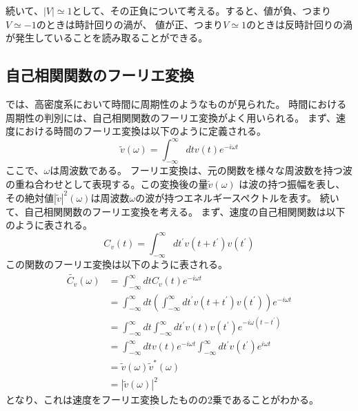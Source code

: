 \documentclass[/Users/ikedahajime/GitHub/reserch/master_report/thesis]{subfiles}
\begin{document}
続いて、$|V|\simeq 1$として、その正負について考える。すると、値が負、つまり$V\simeq -1$のときは時計回りの渦が、
値が正、つまり$V\simeq 1$のときは反時計回りの渦が発生していることを読み取ることができる。

\subsection{自己相関関数のフーリエ変換}
では、高密度系において時間に周期性のようなものが見られた。
時間における周期性の判別には、自己相関関数のフーリエ変換がよく用いられる。
まず、速度における時間のフーリエ変換は以下のように定義される。
\begin{equation}
    \tilde{v}(\omega) =\int_{-\infty}^{\infty} dt v(t)e^{-i\omega t}
\end{equation}
ここで、$\omega$は周波数である。
フーリエ変換は、元の関数を様々な周波数を持つ波の重ね合わせとして表現する。この変換後の量$\tilde{v}(\omega)$
は波の持つ振幅を表し、その絶対値$\left|\tilde{v}\right|^2(\omega)$は周波数$\omega$の波が持つエネルギースペクトルを表す。
続いて、自己相関関数のフーリエ変換を考える。
まず、速度の自己相関関数は以下のように表される。
\begin{equation}
    C_v(t)=\int_{-\infty}^{\infty} dt^\prime v(t+t^\prime)v(t^\prime)
\end{equation}
この関数のフーリエ変換は以下のように表される。
\begin{align}
    \tilde{C_v}(\omega)&= \int_{-\infty}^{\infty} dt C_v(t)e^{-i\omega t}\\
    &=\int_{-\infty}^{\infty} dt \left(\int_{-\infty}^{\infty} dt^\prime v(t+t^\prime)v(t^\prime)\right)e^{-i\omega t} \\
    &=\int_{-\infty}^{\infty} dt \int_{-\infty}^{\infty} dt^\prime v(t)v(t^\prime)e^{-i\omega(t-t^\prime)}\\
    &=\int_{-\infty}^{\infty} dt v(t)e^{-i\omega t}\int_{-\infty}^{\infty}dt^\prime v(t^\prime)e^{i\omega t}\\
    &=\tilde{v}(\omega)\tilde{v}^*(\omega)\\
    &=\left| \tilde{v}(\omega) \right|^2
\end{align}
となり、これは速度をフーリエ変換したものの2乗であることがわかる。
\end{document}
